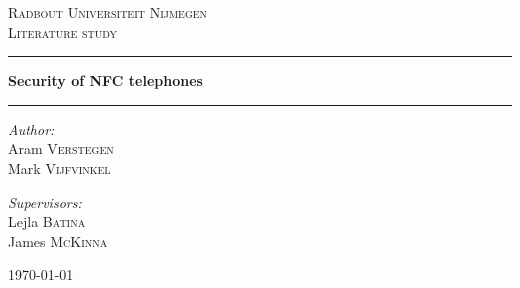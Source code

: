 \begin{titlepage}
\begin{center}
\textsc{\LARGE Radbout Universiteit Nijmegen}\\[1.5cm]
\textsc{\Large Literature study }\\[1.5cm]
\hrule \vspace{0.4cm}
{\huge \bfseries Security of NFC telephones } \\[0.4cm]
\hrule \vspace{1.5cm}

\vspace{2.5cm}
\begin{minipage}{0.4\textwidth}
\begin{flushleft} \large
\emph{Author:}\\
Aram \textsc{Verstegen} \\
Mark \textsc{Vijfvinkel}
\vspace{0.57cm}
\end{flushleft}
\end{minipage}
\begin{minipage}{0.4\textwidth}
\begin{flushright} \large
\emph{Supervisors:} \\
Lejla \textsc{Batina} \\
James \textsc{McKinna}
\end{flushright}
\end{minipage}

 
\vfill

{\large \today}

\end{center}
\end{titlepage}
